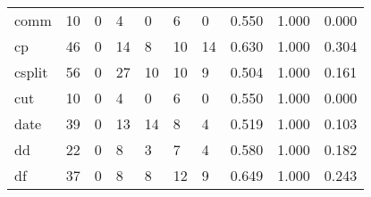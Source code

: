 \begin{longtable}{lp{1.3cm}p{1.3cm}p{1.3cm}p{1.3cm}p{1.3cm}p{1.3cm}p{1.3cm}p{1.3cm}p{1.3cm}}
comm      &                     10 &                                             0 &                                            4 &                                           0 &                                            6 &                                          0 &                                0.550 &                                  1.000 &                                0.000 \\
cp        &                     46 &                                             0 &                                           14 &                                           8 &                                           10 &                                         14 &                                0.630 &                                  1.000 &                                0.304 \\
csplit    &                     56 &                                             0 &                                           27 &                                          10 &                                           10 &                                          9 &                                0.504 &                                  1.000 &                                0.161 \\
cut       &                     10 &                                             0 &                                            4 &                                           0 &                                            6 &                                          0 &                                0.550 &                                  1.000 &                                0.000 \\
date      &                     39 &                                             0 &                                           13 &                                          14 &                                            8 &                                          4 &                                0.519 &                                  1.000 &                                0.103 \\
dd        &                     22 &                                             0 &                                            8 &                                           3 &                                            7 &                                          4 &                                0.580 &                                  1.000 &                                0.182 \\
df        &                     37 &                                             0 &                                            8 &                                           8 &                                           12 &                                          9 &                                0.649 &                                  1.000 &                                0.243 \\

\end{longtable}
